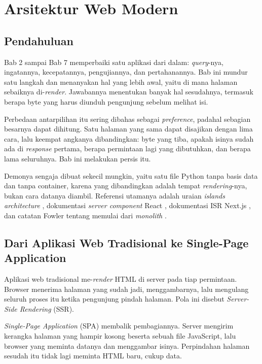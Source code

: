 \chapter{Arsitektur Web Modern}
\label{ch:arsitektur}

\section{Pendahuluan}

Bab 2 sampai Bab 7 memperbaiki satu aplikasi dari dalam: \textit{query}-nya, ingatannya,
kecepatannya, pengujiannya, dan pertahanannya. Bab ini mundur satu langkah dan
menanyakan hal yang lebih awal, yaitu di mana halaman sebaiknya di-\textit{render}.
Jawabannya menentukan banyak hal sesudahnya, termasuk berapa byte yang harus
diunduh pengunjung sebelum melihat isi.

Perbedaan antarpilihan itu sering dibahas sebagai \textit{preference}, padahal sebagian
besarnya dapat dihitung. Satu halaman yang sama dapat disajikan dengan lima
cara, lalu keempat angkanya dibandingkan: byte yang tiba, apakah isinya sudah
ada di \textit{response} pertama, berapa permintaan lagi yang dibutuhkan, dan
berapa lama seluruhnya. Bab ini melakukan persis itu.

Demonya sengaja dibuat sekecil mungkin, yaitu satu file Python tanpa basis
data dan tanpa container, karena yang dibandingkan adalah tempat \textit{rendering}-nya,
bukan cara datanya diambil. Referensi utamanya adalah uraian
\textit{islands architecture} \cite{patterns-islands}, dokumentasi
\textit{server component} React \cite{react-server-components}, dokumentasi
ISR Next.js \cite{nextjs-isr}, dan catatan Fowler tentang memulai dari
\textit{monolith} \cite{fowler-monolith-first}.

\section{Dari Aplikasi Web Tradisional ke Single-Page Application}

Aplikasi web tradisional me-\textit{render} HTML di server pada tiap permintaan. Browser
menerima halaman yang sudah jadi, menggambarnya, lalu mengulang seluruh
proses itu ketika pengunjung pindah halaman. Pola ini disebut
\textit{Server-Side Rendering} (SSR).

\textit{Single-Page Application} (SPA) membalik pembagiannya. Server mengirim
kerangka halaman yang hampir kosong beserta sebuah file JavaScript, lalu
browser yang meminta datanya dan menggambar isinya. Perpindahan halaman
sesudah itu tidak lagi meminta HTML baru, cukup data.


